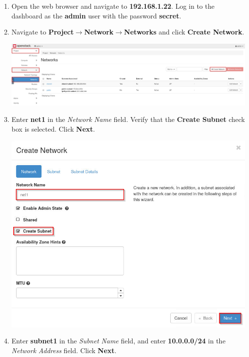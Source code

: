 \documentclass[letterpaper, 12pt]{article}
\begin{document}
\begin{enumerate}
    \item Open the web browser and navigate to \textbf{192.168.1.22}. Log in to the dashboard as the \textbf{admin} user
    with the password \textbf{secret}.

    \item Navigate to \textbf{Project$\rightarrow$Network$\rightarrow$Networks} and click \textbf{Create Network}.

    \begin{center}
        \includegraphics[width=\linewidth]{images/part3/step2.png}
    \end{center}

    \item Enter \textbf{net1} in the \textit{Network Name} field. Verify that the \textbf{Create Subnet} check box is
    selected. Click \textbf{Next}.

    \begin{center}
        \includegraphics[width=\linewidth]{images/part3/step3.png}
    \end{center}

    \item Enter \textbf{subnet1} in the \textit{Subnet Name} field, and enter \textbf{10.0.0.0/24} in the
    \textit{Network Address} field. Click \textbf{Next}.


\end{enumerate}
\end{document}
